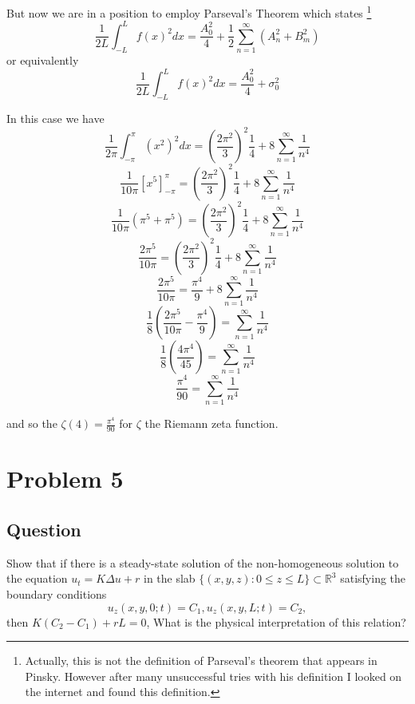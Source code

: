 \documentclass[12pt]{article}
\begin{document}
But now we are in a position to employ Parseval's Theorem which states \cite[Page 71]{pinsky}\footnote{Actually, this is not the definition of Parseval's theorem that appears in Pinsky. However after many unsuccessful tries with his definition I looked on the internet \cite{parseval} and found this definition.}
\[\frac{1}{2 L} \int_{-L}^L f(x)^2 dx = \frac{A_0^2}{4}+\frac{1}{2} \sum_{n=1}^\infty (A_n^2 +B_m^2)\]
or equivalently
\[\frac{1}{2 L} \int_{-L}^L f(x)^2 dx = \frac{A_0^2}{4}+\sigma_0^2\]

In this case we have
\[\frac{1}{2\pi} \int_{-\pi}^\pi (x^2)^2 dx = \left(\frac{2 \pi ^2}{3}\right)^2\frac{1}{4}+ 8\sum_{n=1}^\infty \frac{1 }{n^4 } \]
\[\frac{1}{10 \pi} \left[  x^5 \right]_{-\pi}^\pi= \left(\frac{2 \pi ^2}{3}\right)^2\frac{1}{4}+ 8\sum_{n=1}^\infty \frac{1 }{n^4 } \]
\[\frac{1}{10 \pi} \left(  \pi^5 + \pi^5 \right)=  \left(\frac{2 \pi ^2}{3}\right)^2\frac{1}{4}+ 8\sum_{n=1}^\infty \frac{1 }{n^4 } \]
\[\frac{2 \pi^5}{10 \pi} = \left(\frac{2 \pi ^2}{3}\right)^2\frac{1}{4} + 8\sum_{n=1}^\infty \frac{1 }{n^4 } \]
\[\frac{2 \pi^5}{10 \pi} = \frac{\pi ^4}{9} + 8\sum_{n=1}^\infty \frac{1 }{n^4 } \]
\[ \frac{1}{8} \left( \frac{2 \pi^5}{10 \pi} - \frac{\pi ^4}{9} \right)=   \sum_{n=1}^\infty \frac{1 }{n^4 } \]
\[ \frac{1}{8} \left(\frac{4 \pi ^4}{45} \right)=   \sum_{n=1}^\infty \frac{1 }{n^4 } \]
\[ \frac{ \pi ^4}{90} =   \sum_{n=1}^\infty \frac{1 }{n^4 } \]

and so the $\zeta(4)= \frac{ \pi ^4}{90}$ for $\zeta$ the Riemann zeta function. 


\section{Problem 5}
\subsection{Question}
Show that if there is a steady-state solution of the non-homogeneous solution to the equation $u_t=K\Delta u +r$ in the slab $\{(x,y,z) : 0\leq z \leq L \} \subset \mathbb{R}^3$ satisfying the boundary conditions
\[u_z(x,y,0;t)=C_1, u_z(x,y,L;t)=C_2, \]
then $K(C_2-C_1)+r L = 0$, What is the physical interpretation of this relation?
\end{document}

